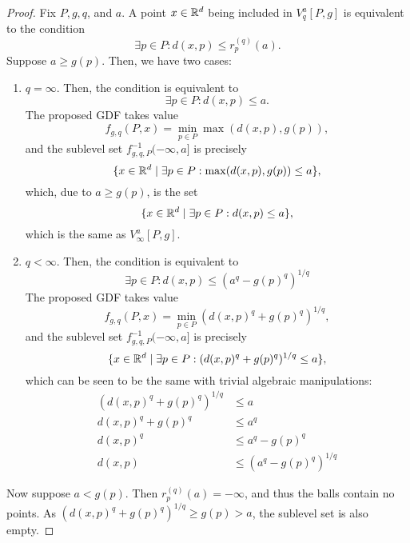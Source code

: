 \begin{proof}
    Fix $P, g, q$, and $a$. A point $x \in \mathbb{R}^d$ being included in $V^a_q[P, g]$
    is equivalent to the condition
    \begin{equation}
        \exists p \in P : d(x, p) \leq r_p^{(q)}(a).
    \end{equation}
    Suppose $a \geq g(p)$. Then, we have two cases:
    \begin{enumerate}
        \item $q = \infty$. Then, the condition is equivalent to
            \begin{equation}
                \exists p \in P : d(x, p) \leq a.
            \end{equation}
            The proposed GDF takes value
            \begin{equation}
                f_{g, q}(P, x) = \min_{p \in P} \max(d(x, p), g(p)),
            \end{equation}
            and the sublevel set $f^{-1}_{g, q, P}(-\infty, a]$ is precisely
            \begin{equation}
                \{x \in \mathbb{R}^d \mid \exists p \in P : \max(d(x, p), g(p)) \leq a\},
            \end{equation}
            which, due to $a \geq g(p)$, is the set
            \begin{equation}
                \{x \in \mathbb{R}^d \mid \exists p \in P : d(x, p) \leq a\},
            \end{equation}
            which is the same as $V^a_\infty[P, g]$.
        \item $q < \infty$. Then, the condition is equivalent to
            \begin{equation}
                \exists p \in P : d(x, p) \leq (a^q - g(p)^q)^{1/q}
            \end{equation}
            The proposed GDF takes value
            \begin{equation}
                f_{g, q}(P, x) = \min_{p \in P} (d(x, p)^q + g(p)^q)^{1/q},
            \end{equation}
            and the sublevel set $f^{-1}_{g, q, P}(-\infty, a]$ is precisely
            \begin{equation}
                \{x \in \mathbb{R}^d \mid \exists p \in P : (d(x, p)^q + g(p)^q)^{1/q} \leq a\},
            \end{equation}
            which can be seen to be the same with trivial algebraic manipulations:
            \begin{align}
                (d(x, p)^q + g(p)^q)^{1/q} & \leq a \\
                d(x, p)^q + g(p)^q & \leq a^q \\
                d(x, p)^q & \leq a^q - g(p)^q\\
                d(x, p) & \leq (a^q - g(p)^q)^{1 / q}
            \end{align}
    \end{enumerate}

    Now suppose $a < g(p)$. Then $r_p^{(q)}(a) = - \infty$, and thus the balls
    contain no points. As $(d(x, p)^q + g(p)^q)^{1/q} \geq g(p) > a$, the sublevel
    set is also empty.
\end{proof}